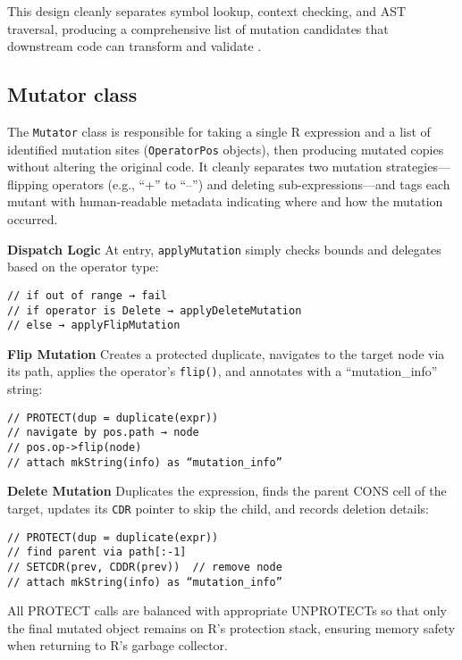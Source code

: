 This design cleanly separates symbol lookup, context checking, and AST traversal, producing a comprehensive list of mutation candidates that downstream code can transform and validate \cite{R-base}.

\subsection{Mutator class}

The \texttt{Mutator} class is responsible for taking a single R expression and a list of identified mutation sites (\texttt{OperatorPos} objects), then producing mutated copies without altering the original code. It cleanly separates two mutation strategies—flipping operators (e.g., “+” to “–”) and deleting sub-expressions—and tags each mutant with human-readable metadata indicating where and how the mutation occurred.

\medskip
\noindent\textbf{Dispatch Logic}  
At entry, \texttt{applyMutation} simply checks bounds and delegates based on the operator type:

\begin{verbatim}
// if out of range → fail
// if operator is Delete → applyDeleteMutation
// else → applyFlipMutation
\end{verbatim}

\medskip
\noindent\textbf{Flip Mutation}  
Creates a protected duplicate, navigates to the target node via its path, applies the operator’s \texttt{flip()}, and annotates with a “mutation_info” string:

\begin{verbatim}
// PROTECT(dup = duplicate(expr))
// navigate by pos.path → node
// pos.op->flip(node)
// attach mkString(info) as “mutation_info”
\end{verbatim}

\medskip
\noindent\textbf{Delete Mutation}  
Duplicates the expression, finds the parent CONS cell of the target, updates its \texttt{CDR} pointer to skip the child, and records deletion details:

\begin{verbatim}
// PROTECT(dup = duplicate(expr))
// find parent via path[:-1]
// SETCDR(prev, CDDR(prev))  // remove node
// attach mkString(info) as “mutation_info”
\end{verbatim}

All PROTECT calls are balanced with appropriate UNPROTECTs so that only the final mutated object remains on R’s protection stack, ensuring memory safety when returning to R’s garbage collector.  


